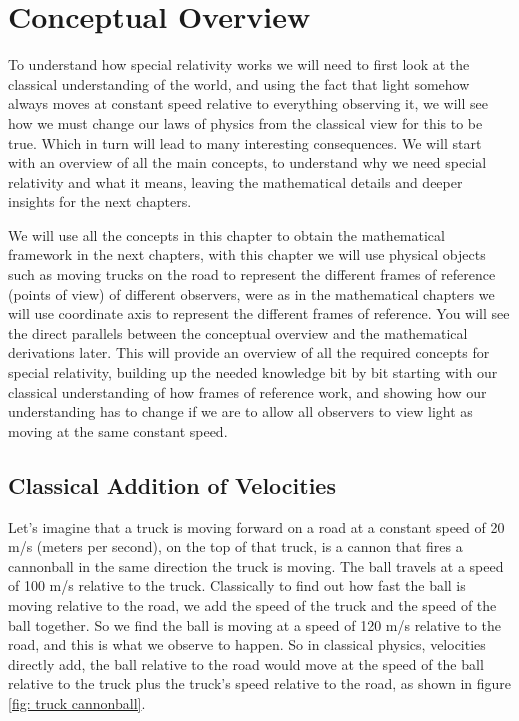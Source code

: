 \mainmatter
\chapter{Conceptual Overview}

To understand how special relativity works we will need to first look at the classical understanding of the world, and using the fact that light somehow always moves at constant speed relative to everything observing it, we will see how we must change our laws of physics from the classical view for this to be true. Which in turn will lead to many interesting consequences. We will start with an overview of all the main concepts, to understand why we need special relativity and what it means, leaving the mathematical details and deeper insights for the next chapters.

We will use all the concepts in this chapter to obtain the mathematical framework in the next chapters, with this chapter we will use physical objects such as moving trucks on the road to represent the different frames of reference (points of view) of different observers, were as in the mathematical chapters we will use coordinate axis to represent the different frames of reference. You will see the direct parallels between the conceptual overview and the mathematical derivations later. This will provide an overview of all the required concepts for special relativity, building up the needed knowledge bit by bit starting with our classical understanding of how frames of reference work, and showing how our understanding has to change if we are to allow all observers to view light as moving at the same constant speed.

\section{Classical Addition of Velocities}\label{Sect: classical velocity addition}

Let's imagine that a truck is moving forward on a road at a constant speed of 20 m/s (meters per second), on the top of that truck, is a cannon that fires a cannonball in the same direction the truck is moving. The ball travels at a speed of 100 m/s relative to the truck. Classically to find out how fast the ball is moving relative to the road, we add the speed of the truck and the speed of the ball together. So we find the ball is moving at a speed of 120 m/s relative to the road, and this is what we observe to happen. So in classical physics, velocities directly add, the ball relative to the road would move at the speed of the ball relative to the truck plus the truck's speed relative to the road, as shown in figure \ref{fig: truck cannonball}.

